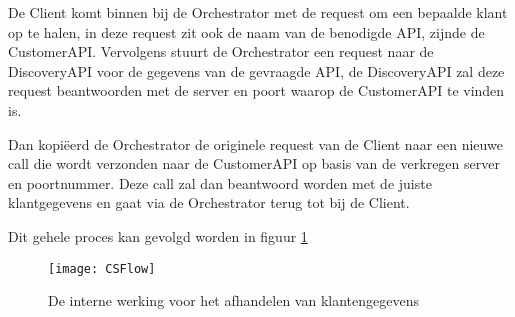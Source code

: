  De Client komt binnen bij de Orchestrator met de request om een bepaalde klant op te halen, in deze request zit ook de naam van de benodigde API, zijnde de CustomerAPI. Vervolgens stuurt de Orchestrator een request naar de DiscoveryAPI voor de gegevens van de gevraagde API, de DiscoveryAPI zal deze request beantwoorden met de server en poort waarop de CustomerAPI te vinden is. 
 
 Dan kopiëerd de Orchestrator de originele request van de Client naar een nieuwe call die wordt verzonden naar de CustomerAPI op basis van de verkregen server en poortnummer. Deze call zal dan beantwoord worden met de juiste klantgegevens en gaat via de Orchestrator terug tot bij de Client. 
 
 Dit gehele proces kan gevolgd worden in figuur \ref{fig:CSFlow}
 
 \begin{figure}[H]
     \centering
     \texttt{[image: CSFlow]}
     \caption[Customer Service Dataflow]{De interne werking voor het afhandelen van klantengegevens}
     \label{fig:CSFlow}
 \end{figure}
 
 
 
 








